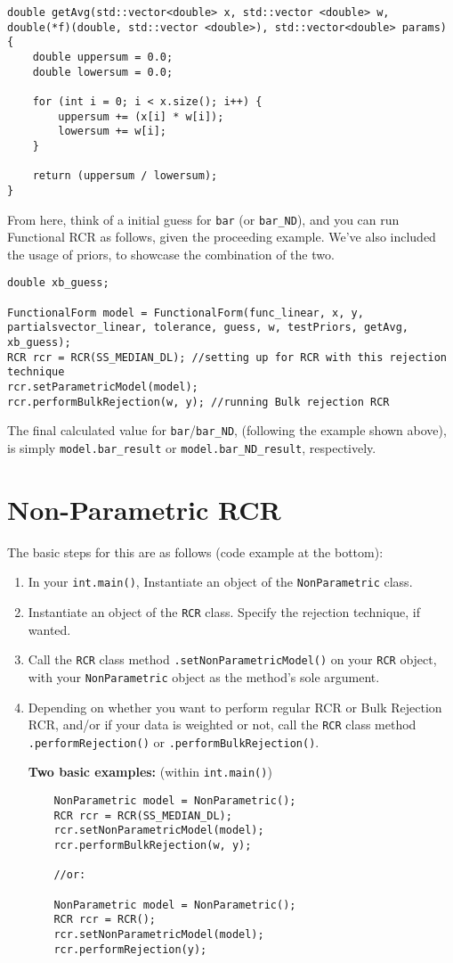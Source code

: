 \documentclass[12pt]{article}
\newcommand{\li}{\lstinline}
\begin{document}
\begin{lstlisting}
double getAvg(std::vector<double> x, std::vector <double> w, double(*f)(double, std::vector <double>), std::vector<double> params) {
	double uppersum = 0.0;
	double lowersum = 0.0;

	for (int i = 0; i < x.size(); i++) {
		uppersum += (x[i] * w[i]);
		lowersum += w[i];
	}

	return (uppersum / lowersum);
}
\end{lstlisting}
\par From here, think of a initial guess for \li{bar} (or \li{bar_ND}), and you can run Functional RCR as follows, given the proceeding example. We've also included the usage of priors, to showcase the combination of the two.
\newpage
\begin{lstlisting}
double xb_guess;

FunctionalForm model = FunctionalForm(func_linear, x, y, partialsvector_linear, tolerance, guess, w, testPriors, getAvg, xb_guess);
RCR rcr = RCR(SS_MEDIAN_DL); //setting up for RCR with this rejection technique
rcr.setParametricModel(model);
rcr.performBulkRejection(w, y); //running Bulk rejection RCR
\end{lstlisting}
The final calculated value for \li{bar}/\li{bar_ND}, (following the example shown above), is simply \li{model.bar_result} or \li{model.bar_ND_result}, respectively.
\section{Non-Parametric RCR}
The basic steps for this are as follows (code example at the bottom):
\begin{enumerate}
	\item In your \texttt{int.main()}, Instantiate an object of the \texttt{NonParametric} class.
	\item Instantiate an object of the \texttt{RCR} class. Specify the rejection technique, if wanted.
	\item Call the \texttt{RCR} class method \texttt{.setNonParametricModel()} on your \texttt{RCR} object, with your \texttt{NonParametric} object as the method's sole argument.
	\item Depending on whether you want to perform regular RCR or Bulk Rejection RCR, and/or if your data is weighted or not, call the \texttt{RCR} class method \texttt{.performRejection()} or \texttt{.performBulkRejection()}. 
	
	\newpage
	\par \textbf{Two basic examples:} (within \texttt{int.main()})
	\begin{lstlisting}
	NonParametric model = NonParametric();
	RCR rcr = RCR(SS_MEDIAN_DL);
	rcr.setNonParametricModel(model);
	rcr.performBulkRejection(w, y);
	
	//or:
	
	NonParametric model = NonParametric();
	RCR rcr = RCR();
	rcr.setNonParametricModel(model);
	rcr.performRejection(y);
	\end{lstlisting}
\end{enumerate}
\end{document}
